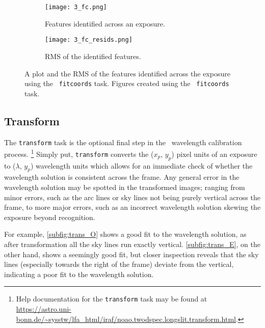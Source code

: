 \begin{figure}
    \centering
    \begin{subfigure}[b]{0.49\textwidth}
        \centering
        \texttt{[image: 3\_fc.png]}
        \caption{Features identified across an exposure.}
    \end{subfigure}
    \hfill
    \begin{subfigure}[b]{0.49\textwidth}
        \centering
        \texttt{[image: 3\_fc\_resids.png]}
        \caption{\gls{RMS} of the identified features.}
    \end{subfigure}
    \caption{A plot and the \gls{RMS} of the features identified across the exposure using the \iraf\ \texttt{fitcoords} task. Figures created using the \iraf\ \texttt{fitcoords} task.}
    \label{fig:iraf_fc_plot}
\end{figure}

\subsection{Transform} \label{subsec:iraf_transform}

The \texttt{transform} task is the optional final step in the \iraf\ wavelength calibration process.%
\footnote{Help documentation for the \texttt{transform} task may be found at \url{https://astro.uni-bonn.de/~sysstw/lfa_html/iraf/noao.twodspec.longslit.transform.html}.}
Simply put, \texttt{transform} converts the ($x_p$, $y_p$) pixel units of an exposure to ($\lambda$, $y_p$) wavelength units which allows for an immediate check of whether the wavelength solution is consistent across the frame. Any general error in the wavelength solution may be spotted in the transformed images; ranging from minor errors, such as the arc lines or sky lines not being purely vertical across the frame, to more major errors, such as an incorrect wavelength solution skewing the exposure beyond recognition.

For example, \autoref{subfig:trans_O} shows a good fit to the wavelength solution, as after transformation all the sky lines run exactly vertical. \autoref{subfig:trans_E}, on the other hand, shows a seemingly good fit, but closer inspection reveals that the sky lines (especially towards the right of the frame) deviate from the vertical, indicating a poor fit to the wavelength solution.

